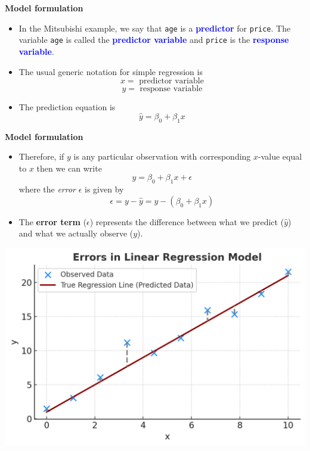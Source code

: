\documentclass[landscape]{slides}
\newcommand{\heading}[1]{%
  \begin{center}
    \large\bf \color{red}
        #1
  \end{center}
  \vspace{1ex minus 1ex}}
\begin{document}
\begin{slide}
\heading{Model formulation}
\begin{itemize}
\item In the Mitsubishi example, we say that {\tt age} is a \textcolor{blue}{\bf predictor} for 
{\tt price}. The variable {\tt age} is called the \textcolor{blue}{\bf predictor variable} and
{\tt price} is the \textcolor{blue}{\bf response variable}.

\item The usual generic notation for simple regression is
$$x=\mbox{ predictor variable}$$
$$y=\mbox{ response variable}$$

\item The prediction equation is
%
$$\hat{y}=\beta_0+\beta_1 x$$
\end{itemize}
\end{slide}
\begin{slide}
\heading{Model formulation}
\begin{itemize}

\item Therefore, if $y$ is any particular observation with corresponding $x$-value equal to 
$x$ then we can write 
$$y=\beta_0+\beta_1 x+\epsilon$$
where the {\it error } $\epsilon$ is given by
$$\epsilon=y-\hat{y}=y-(\beta_0+\beta_1 x)$$
		\item The \textbf{error term} ($\epsilon$) represents the difference between what we predict ($\hat{y}$) and what we actually observe ($y$).
\end{itemize}
\end{slide}


\begin{slide}
	\begin{center}
		\includegraphics[width=1\textwidth]{errors.png}
	\end{center}
	
\end{slide}
\end{document}
